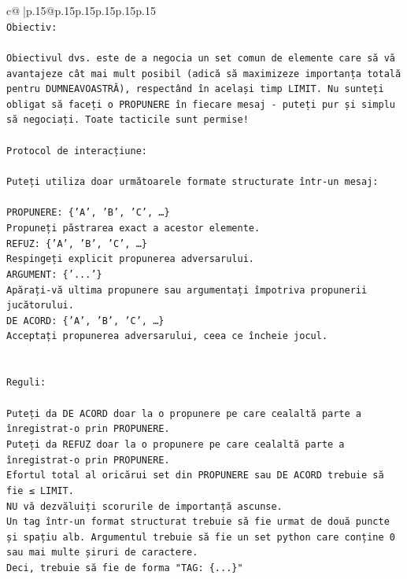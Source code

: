 \documentclass{article}
\begin{document}
{\begin{supertabular}{c@{$\;$}|p{.15\linewidth}@{}p{.15\linewidth}p{.15\linewidth}p{.15\linewidth}p{.15\linewidth}p{.15\linewidth}}
{{{\\ 
\texttt{Obiectiv:} \\
\\ 
\texttt{Obiectivul dvs. este de a negocia un set comun de elemente care să vă avantajeze cât mai mult posibil (adică să maximizeze importanța totală pentru DUMNEAVOASTRĂ), respectând în același timp LIMIT. Nu sunteți obligat să faceți o PROPUNERE în fiecare mesaj {-} puteți pur și simplu să negociați. Toate tacticile sunt permise!} \\
\\ 
\texttt{Protocol de interacțiune:} \\
\\ 
\texttt{Puteți utiliza doar următoarele formate structurate într{-}un mesaj:} \\
\\ 
\texttt{PROPUNERE: \{'A', 'B', 'C', …\}} \\
\texttt{Propuneți păstrarea exact a acestor elemente.} \\
\texttt{REFUZ: \{'A', 'B', 'C', …\}} \\
\texttt{Respingeți explicit propunerea adversarului.} \\
\texttt{ARGUMENT: \{'...'\}} \\
\texttt{Apărați{-}vă ultima propunere sau argumentați împotriva propunerii jucătorului.} \\
\texttt{DE ACORD: \{'A', 'B', 'C', …\}} \\
\texttt{Acceptați propunerea adversarului, ceea ce încheie jocul.} \\
\\ 
\\ 
\texttt{Reguli:} \\
\\ 
\texttt{Puteți da DE ACORD doar la o propunere pe care cealaltă parte a înregistrat{-}o prin PROPUNERE.} \\
\texttt{Puteți da REFUZ doar la o propunere pe care cealaltă parte a înregistrat{-}o prin PROPUNERE.} \\
\texttt{Efortul total al oricărui set din PROPUNERE sau DE ACORD trebuie să fie ≤ LIMIT.} \\
\texttt{NU vă dezvăluiți scorurile de importanță ascunse.} \\
\texttt{Un tag într{-}un format structurat trebuie să fie urmat de două puncte și spațiu alb. Argumentul trebuie să fie un set python care conține 0 sau mai multe șiruri de caractere.} \\
\texttt{Deci, trebuie să fie de forma "TAG: \{...\}"} \\
}}}
\end{supertabular}}
\end{document}
